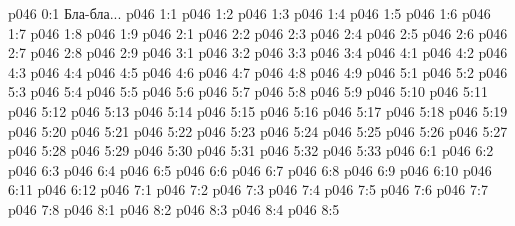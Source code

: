 \author{Архангел}
\vs p046 0:1  Бла-бла...
\vs p046 1:1 
\vs p046 1:2 \pc 
\vs p046 1:3 \pc 
\vs p046 1:4 \pc 
\vs p046 1:5 
\vs p046 1:6 
\vs p046 1:7 
\vs p046 1:8 \pc 
\vs p046 1:9 
\vs p046 2:1 
\vs p046 2:2 
\vs p046 2:3 
\vs p046 2:4 
\vs p046 2:5 \pc 
\vs p046 2:6 
\vs p046 2:7 \pc 
\vs p046 2:8 \pc 
\vs p046 2:9 
\vs p046 3:1 
\vs p046 3:2 
\vs p046 3:3 
\vs p046 3:4 \pc 
{}
\vs p046 4:1 
\vs p046 4:2 
\vs p046 4:3 
\vs p046 4:4 
\vs p046 4:5 
\vs p046 4:6 \pc 
\vs p046 4:7 \pc 
\vs p046 4:8 
\vs p046 4:9 
\vs p046 5:1 
\vs p046 5:2 
\vs p046 5:3 
\vs p046 5:4 
\vs p046 5:5 
\vs p046 5:6 
\vs p046 5:7 
\vs p046 5:8 
\vs p046 5:9 \pc 
\vs p046 5:10 
\vs p046 5:11 
\vs p046 5:12 
\vs p046 5:13 
\vs p046 5:14 
\vs p046 5:15 
\vs p046 5:16 
\vs p046 5:17 
\vs p046 5:18 
\vs p046 5:19 
\vs p046 5:20 
\vs p046 5:21 \pc 
\vs p046 5:22 
\vs p046 5:23 
\vs p046 5:24 
\vs p046 5:25 
\vs p046 5:26 
\vs p046 5:27 
\vs p046 5:28 
\vs p046 5:29 
\vs p046 5:30 
\vs p046 5:31 
\vs p046 5:32 
\vs p046 5:33 \pc 
{}
\vs p046 6:1 
\vs p046 6:2 
\vs p046 6:3 
\vs p046 6:4 
\vs p046 6:5 
\vs p046 6:6 
\vs p046 6:7 
\vs p046 6:8 
\vs p046 6:9 
\vs p046 6:10 
\vs p046 6:11 
\vs p046 6:12 \pc 
{}
\vs p046 7:1 
\vs p046 7:2 
\vs p046 7:3 
\vs p046 7:4 \pc 
\vs p046 7:5 
\vs p046 7:6 \pc 
\vs p046 7:7 
\vs p046 7:8 \pc 
{}
\vs p046 8:1 
\vs p046 8:2 
\vs p046 8:3 \pc 
\vs p046 8:4 \pc 
\vsetoff
\vs p046 8:5 
\quizlink
